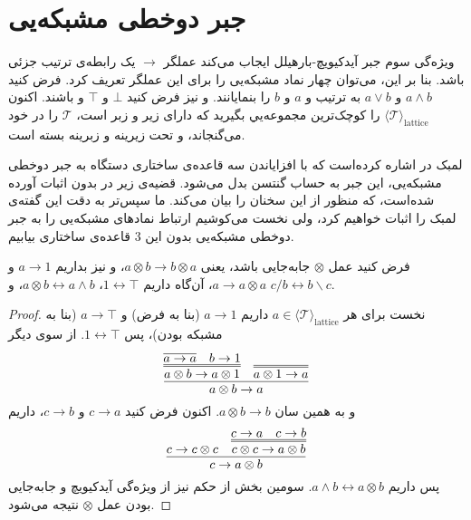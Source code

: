 \section{جبر دوخطی مشبکه‌یی}

ویژه‌گی سوم جبر آیدکیویچ-بارهیلل ایجاب می‌کند
عملگر
$\rightarrow$
یک رابطه‌ی ترتیب جزئی باشد. 
بنا بر این، می‌توان چهار نماد مشبکه‌یی را برای این عملگر تعریف کرد.
فرض کنید
$a \wedge b$
و
$a \vee b$
به ترتیب
و
$a$
و
$b$
را بنمایانند.
و نیز فرض کنید 
$\bot$
و
$\top$
و
باشند.
اکنون 
$\langle \mathcal{T} \rangle_{\mathrm{lattice}}$
را کوچک‌ترین مجموعه‌یي بگیرید که دارای زیر و زبر است،
$\mathcal{T}$
را در خود می‌گنجاند، و تحت زیرینه و زبرینه بسته است.

لمبک در 
\cite{Lambek:Bilinear}
اشاره کرده‌است که با افزایاندن سه قاعده‌ی ساختاری دستگاه
به جبر دوخطی مشبکه‌یی، این جبر به حساب گنتسن بدل می‌شود.
قضیه‌ی زیر در
\cite{Lambek:Bilinear}
بدون اثبات آورده شده‌است، که منظور از این سخنان را بیان می‌کند.
ما سپس‌تر به دقت این گفته‌ی لمبک را اثبات خواهیم کرد، ولی نخست می‌کوشیم ارتباط نمادهای مشبکه‌یی را به جبر دوخطی مشبکه‌یی بدون این 3 قاعده‌ی ساختاری بیابیم.

\begin{theorem}
فرض کنید عمل 
$\otimes$
جابه‌جایی باشد، یعنی
$a \otimes b \rightarrow b \otimes a$،
و نیز بداریم
$a \rightarrow 1$
و
$a \rightarrow a \otimes a$،
آن‌گاه داریم
$1 \leftrightarrow \top$،
$a \otimes b \leftrightarrow a \wedge b$،
و
$c / b \leftrightarrow b \backslash c$.
\end{theorem}

\begin{proof}
نخست برای هر 
$a \in \langle \mathcal{T} \rangle_{\mathrm{lattice}}$
داریم
$a \rightarrow 1$
(بنا به فرض)
و
$a \rightarrow \top$
(بنا به مشبکه بودن)،
پس
$1 \leftrightarrow \top$.
از سوی دیگر
\[
\infer{a \otimes b \rightarrow a}{
	\infer={a \otimes b \rightarrow a \otimes 1}{
		\infer{a \rightarrow a}{}
		&
		b \rightarrow 1
	}
	&
	\infer={a \otimes 1 \rightarrow a}{}
}
\]
و به همین سان
$a \otimes b \rightarrow b$.
اکنون فرض کنید 
$c \rightarrow a$
و
$c \rightarrow b$،
داریم
\[
\infer{c \rightarrow a \otimes b}{
	c \rightarrow c \otimes c
	&
	\infer={c \otimes c \rightarrow a \otimes b}{
		c \rightarrow a
		&
		c \rightarrow b
	}
}
\]
پس داریم
$a \wedge b \leftrightarrow a \otimes b$.
سومین بخش از حکم نیز از ویژه‌گی آیدکیویچ و جابه‌جایی بودن عمل 
$\otimes$
نتیجه می‌شود.
\end{proof}

